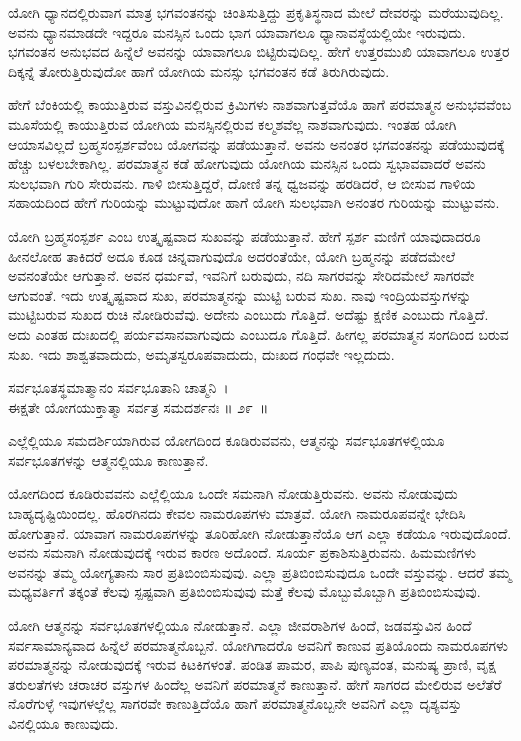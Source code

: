 ಯೋಗಿ ಧ್ಯಾನದಲ್ಲಿರುವಾಗ ಮಾತ್ರ ಭಗವಂತನನ್ನು ಚಿಂತಿಸುತ್ತಿದ್ದು ಪ್ರಕೃತಿಸ್ಥನಾದ ಮೇಲೆ ದೇವರನ್ನು ಮರೆಯುವುದಿಲ್ಲ. ಅವನು ಧ್ಯಾನಮಾಡದೇ ಇದ್ದರೂ ಮನಸ್ಸಿನ ಒಂದು ಭಾಗ ಯಾವಾಗಲೂ ಧ್ಯಾನಾವಸ್ಥೆಯಲ್ಲಿಯೇ ಇರುವುದು. ಭಗವಂತನ ಅನುಭವದ ಹಿನ್ನೆಲೆ ಅವನನ್ನು ಯಾವಾಗಲೂ ಬಿಟ್ಟಿರುವುದಿಲ್ಲ. ಹೇಗೆ ಉತ್ತರಮುಖಿ ಯಾವಾಗಲೂ ಉತ್ತರ ದಿಕ್ಕನ್ನೆ ತೋರುತ್ತಿರುವುದೋ ಹಾಗೆ ಯೋಗಿಯ ಮನಸ್ಸು ಭಗವಂತನ ಕಡೆ ತಿರುಗಿರುವುದು.

ಹೇಗೆ ಬೆಂಕಿಯಲ್ಲಿ ಕಾಯುತ್ತಿರುವ ವಸ್ತುವಿನಲ್ಲಿರುವ ಕ್ರಿಮಿಗಳು ನಾಶವಾಗುತ್ತವೆಯೊ ಹಾಗೆ ಪರಮಾತ್ಮನ ಅನುಭವವೆಂಬ ಮೂಸೆಯಲ್ಲಿ ಕಾಯುತ್ತಿರುವ ಯೋಗಿಯ ಮನಸ್ಸಿನಲ್ಲಿರುವ ಕಲ್ಮಶವೆಲ್ಲ ನಾಶವಾಗುವುದು. ಇಂತಹ ಯೋಗಿ ಆಯಾಸವಿಲ್ಲದೆ ಬ್ರಹ್ಮಸಂಸ್ಪರ್ಶವೆಂಬ ಯೋಗವನ್ನು ಪಡೆಯುತ್ತಾನೆ. ಅವನು ಅನಂತರ ಭಗವಂತನನ್ನು ಪಡೆಯುವುದಕ್ಕೆ ಹೆಚ್ಚು ಬಳಲಬೇಕಾಗಿಲ್ಲ. ಪರಮಾತ್ಮನ ಕಡೆ ಹೋಗುವುದು ಯೋಗಿಯ ಮನಸ್ಸಿನ ಒಂದು ಸ್ವಭಾವವಾದರೆ ಅವನು ಸುಲಭವಾಗಿ ಗುರಿ ಸೇರುವನು. ಗಾಳಿ ಬೀಸುತ್ತಿದ್ದರೆ, ದೋಣಿ ತನ್ನ ಧ್ವಜವನ್ನು ಹರಡಿದರೆ, ಆ ಬೀಸುವ ಗಾಳಿಯ ಸಹಾಯದಿಂದ ಹೇಗೆ ಗುರಿಯನ್ನು ಮುಟ್ಟುವುದೋ ಹಾಗೆ ಯೋಗಿ ಸುಲಭವಾಗಿ ಅನಂತರ ಗುರಿಯನ್ನು ಮುಟ್ಟುವನು.

ಯೋಗಿ ಬ್ರಹ್ಮಸಂಸ್ಪರ್ಶ ಎಂಬ ಉತ್ಕೃಷ್ಟವಾದ ಸುಖವನ್ನು ಪಡೆಯುತ್ತಾನೆ. ಹೇಗೆ ಸ್ಪರ್ಶ ಮಣಿಗೆ ಯಾವುದಾದರೂ ಹೀನಲೋಹ ತಾಕಿದರೆ ಅದೂ ಕೂಡ ಚಿನ್ನವಾಗುವುದೊ ಅದರಂತೆಯೇ, ಯೋಗಿ ಬ್ರಹ್ಮನನ್ನು ಪಡೆದಮೇಲೆ ಅವನಂತೆಯೇ ಆಗುತ್ತಾನೆ. ಅವನ ಧರ್ಮವೆ, ಇವನಿಗೆ ಬರುವುದು, ನದಿ ಸಾಗರವನ್ನು ಸೇರಿದಮೇಲೆ ಸಾಗರವೇ ಆಗುವಂತೆ. ಇದು ಉತ್ಕೃಷ್ಟವಾದ ಸುಖ, ಪರಮಾತ್ಮನನ್ನು ಮುಟ್ಟಿ ಬರುವ ಸುಖ. ನಾವು ಇಂದ್ರಿಯವಸ್ತುಗಳನ್ನು ಮುಟ್ಟಿಬರುವ ಸುಖದ ರುಚಿ ನೋಡಿರುವೆವು. ಅದೇನು ಎಂಬುದು ಗೊತ್ತಿದೆ. ಅದೆಷ್ಟು ಕ್ಷಣಿಕ ಎಂಬುದು ಗೊತ್ತಿದೆ. ಅದು ಎಂತಹ ದುಃಖದಲ್ಲಿ ಪರ್ಯವಸಾನವಾಗುವುದು ಎಂಬುದೂ ಗೊತ್ತಿದೆ. ಹೀಗಲ್ಲ ಪರಮಾತ್ಮನ ಸಂಗದಿಂದ ಬರುವ ಸುಖ. ಇದು ಶಾಶ್ವತವಾದುದು, ಅಮೃತಸ್ವರೂಪವಾದುದು, ದುಃಖದ ಗಂಧವೇ ಇಲ್ಲದುದು.

\begin{shloka}
ಸರ್ವಭೂತಸ್ಥಮಾತ್ಮಾನಂ ಸರ್ವಭೂತಾನಿ ಚಾತ್ಮನಿ~।\\ಈಕ್ಷತೇ ಯೋಗಯುಕ್ತಾತ್ಮಾ ಸರ್ವತ್ರ ಸಮದರ್ಶನಃ \hfill॥ ೨೯~॥
\end{shloka}

\begin{artha}
ಎಲ್ಲೆಲ್ಲಿಯೂ ಸಮದರ್ಶಿಯಾಗಿರುವ ಯೋಗದಿಂದ ಕೂಡಿರುವವನು, ಆತ್ಮನನ್ನು ಸರ್ವಭೂತಗಳಲ್ಲಿಯೂ ಸರ್ವಭೂತಗಳನ್ನು ಆತ್ಮನಲ್ಲಿಯೂ ಕಾಣುತ್ತಾನೆ.
\end{artha}

ಯೋಗದಿಂದ ಕೂಡಿರುವವನು ಎಲ್ಲೆಲ್ಲಿಯೂ ಒಂದೇ ಸಮನಾಗಿ ನೋಡುತ್ತಿರುವನು. ಅವನು ನೋಡುವುದು ಬಾಹ್ಯದೃಷ್ಟಿಯಿಂದಲ್ಲ. ಹೊರಗಿನದು ಕೇವಲ ನಾಮರೂಪಗಳು ಮಾತ್ರವೆ. ಯೋಗಿ ನಾಮರೂಪವನ್ನೇ ಭೇದಿಸಿ ಹೋಗುತ್ತಾನೆ. ಯಾವಾಗ ನಾಮರೂಪಗಳನ್ನು ತೂರಿಹೋಗಿ ನೋಡುತ್ತಾನೆಯೊ ಆಗ ಎಲ್ಲಾ ಕಡೆಯೂ ಇರುವುದೊಂದೆ. ಅವನು ಸಮನಾಗಿ ನೋಡುವುದಕ್ಕೆ ಇರುವ ಕಾರಣ ಅದೊಂದೆ. ಸೂರ್ಯ ಪ್ರಕಾಶಿಸುತ್ತಿರುವನು. ಹಿಮಮಣಿಗಳು ಅವನನ್ನು ತಮ್ಮ ಯೋಗ್ಯತಾನು ಸಾರ ಪ್ರತಿಬಿಂಬಿಸುವುವು. ಎಲ್ಲಾ ಪ್ರತಿಬಿಂಬಿಸುವುದೂ ಒಂದೇ ವಸ್ತುವನ್ನು. ಆದರೆ ತಮ್ಮ ಮಧ್ಯವರ್ತಿಗೆ ತಕ್ಕಂತೆ ಕೆಲವು ಸ್ಪಷ್ಟವಾಗಿ ಪ್ರತಿಬಿಂಬಿಸುವುವು ಮತ್ತೆ ಕೆಲವು ಮೊಬ್ಬುಮೊಬ್ಬಾಗಿ ಪ್ರತಿಬಿಂಬಿಸುವುವು.

ಯೋಗಿ ಆತ್ಮನನ್ನು ಸರ್ವಭೂತಗಳಲ್ಲಿಯೂ ನೋಡುತ್ತಾನೆ. ಎಲ್ಲಾ ಜೀವರಾಶಿಗಳ ಹಿಂದೆ, ಜಡವಸ್ತುವಿನ ಹಿಂದೆ ಸರ್ವಸಾಮಾನ್ಯವಾದ ಹಿನ್ನೆಲೆ ಪರಮಾತ್ಮನೊಬ್ಬನೆ. ಯೋಗಿಗಾದರೊ ಅವನಿಗೆ ಕಾಣುವ ಪ್ರತಿಯೊಂದು ನಾಮರೂಪಗಳು ಪರಮಾತ್ಮನನ್ನು ನೋಡುವುದಕ್ಕೆ ಇರುವ ಕಿಟಕಿಗಳಂತೆ. ಪಂಡಿತ ಪಾಮರ, ಪಾಪಿ ಪುಣ್ಯವಂತ, ಮನುಷ್ಯ ಪ್ರಾಣಿ, ವೃಕ್ಷ ತರುಲತೆಗಳು ಚರಾಚರ ವಸ್ತುಗಳ ಹಿಂದೆಲ್ಲ ಅವನಿಗೆ ಪರಮಾತ್ಮನೆ ಕಾಣುತ್ತಾನೆ. ಹೇಗೆ ಸಾಗರದ ಮೇಲಿರುವ ಅಲೆತೆರೆ ನೊರೆಗುಳ್ಳೆ ಇವುಗಳಲ್ಲೆಲ್ಲ ಸಾಗರವೇ ಕಾಣುತ್ತಿದೆಯೊ ಹಾಗೆ ಪರಮಾತ್ಮನೊಬ್ಬನೇ ಅವನಿಗೆ ಎಲ್ಲಾ ದೃಶ್ಯವಸ್ತು ವಿನಲ್ಲಿಯೂ ಕಾಣುವುದು.

